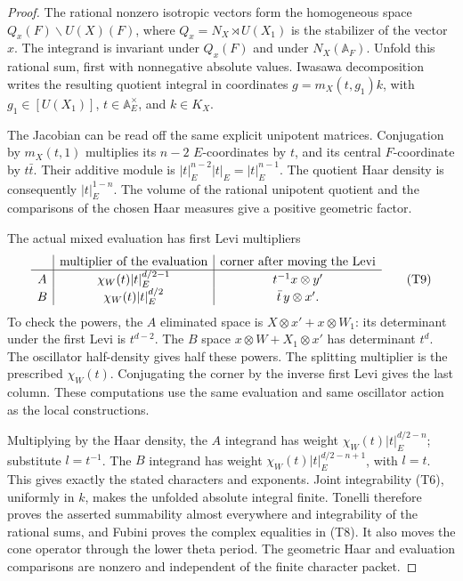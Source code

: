 \begin{proof}
The rational nonzero isotropic vectors form the homogeneous space
\(Q_x(F)\backslash U(X)(F)\), where
\(Q_x=N_X\rtimes U(X_1)\) is the stabilizer of the vector \(x\).
The integrand is invariant under \(Q_x(F)\) and under \(N_X(\mathbb A_F)\).
Unfold this rational sum, first with nonnegative absolute values.
Iwasawa decomposition writes the resulting quotient integral in
coordinates \(g=m_X(t,g_1)k\), with
\(g_1\in[U(X_1)]\), \(t\in\mathbb A_E^\times\), and \(k\in K_X\).

The Jacobian can be read off the same explicit unipotent matrices.
Conjugation by \(m_X(t,1)\) multiplies its \(n-2\) \(E\)-coordinates
by \(t\), and its central \(F\)-coordinate by \(t\bar t\).
Their additive module is \(|t|_E^{n-2}|t|_E=|t|_E^{n-1}\).
The quotient Haar density is consequently \(|t|_E^{1-n}\).
The volume of the rational unipotent quotient and the comparisons of
the chosen Haar measures give a positive geometric factor.

The actual mixed evaluation has first Levi multipliers
\[
 \begin{array}{c|c|c}
       &\hbox{multiplier of the evaluation}
                  &\hbox{corner after moving the Levi}\\ \hline
 A&\chi_W(t)|t|_E^{d/2-1}
                    &t^{-1}x\otimes y'\\
 B&\chi_W(t)|t|_E^{d/2}
                    &\bar t\,y\otimes x'.
 \end{array}                                      \tag{T9}
 \label{eq:sr-theta-evaluation-levi-table}
\]
To check the powers, the \(A\) eliminated space is
\(X\otimes x'+x\otimes W_1\): its determinant under the first Levi
is \(t^{d-2}\). The \(B\) space
\(x\otimes W+X_1\otimes x'\) has determinant \(t^d\).
The oscillator half-density gives half these powers.
The splitting multiplier is the prescribed \(\chi_W(t)\).
Conjugating the corner by the inverse first Levi gives the last
column. These computations use the same evaluation and same
oscillator action as the local constructions.

Multiplying by the Haar density, the \(A\) integrand has weight
\(\chi_W(t)|t|_E^{d/2-n}\); substitute \(l=t^{-1}\).
The \(B\) integrand has weight
\(\chi_W(t)|t|_E^{d/2-n+1}\), with \(l=t\).
This gives exactly the stated characters and exponents.
Joint integrability (T6), uniformly in \(k\), makes the unfolded
absolute integral finite. Tonelli therefore proves the asserted
summability almost everywhere and integrability of the rational
sums, and Fubini proves the complex equalities in (T8).
It also moves the cone operator through the lower theta period.
The geometric Haar and evaluation comparisons are nonzero and
independent of the finite character packet.
\end{proof}

